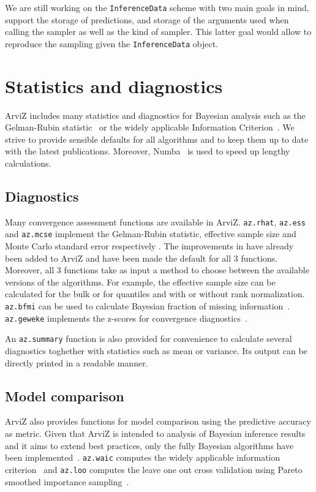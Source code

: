 \documentclass[anonymous=false, %
               format=acmsmall, %
               review=true, %
               screen=true, %
               nonacm=true]{acmart}
\begin{document}
We are still working on the \texttt{InferenceData} scheme with two main goals
in mind, support the storage of predictions, and storage of the arguments used
when calling the sampler as well as the kind of sampler. This latter goal
would allow to reproduce the sampling given the \texttt{InferenceData} object.

\section{Statistics and diagnostics}\label{sec:stats}
ArviZ includes many statistics and diagnostics for Bayesian
analysis such as the Gelman-Rubin statistic~\cite{gelman1992rhat} or the
widely applicable Information Criterion~\cite{watanabe2010waic}.
We strive to provide sensible defaults for all algorithms and to
keep them up to date with the latest publications. Moreover,
Numba~\cite{lam2015numba} is used to
speed up lengthy calculations.

\subsection{Diagnostics}
Many convergence assessment functions are available in ArviZ.
\texttt{az.rhat}, \texttt{az.ess} and \texttt{az.mcse}
implement the Gelman-Rubin statistic, effective sample size and Monte Carlo
standard error respectively \cite{gelman1992rhat, gelman2013bayesian}. %
The improvements in \citet{vehtari2019rank} have already been added to
ArviZ and have been made the default for all 3 functions. Moreover, all 3 functions take
as input a method to choose between the available versions of the algorithms.
For example, the effective sample size can be calculated for the bulk or for
quantiles and with or without rank normalization.
\texttt{az.bfmi} can be used to calculate Bayesian fraction
of missing information~\cite{betancourt2016diagnosing}. \texttt{az.geweke}
implements the z-scores for convergence diagnostics~\cite{geweke1991evaluating}.

An \texttt{az.summary} function is also provided for convenience to calculate
several diagnostics toghether with statistics such as mean or variance.
Its output can be directly printed in a readable manner.

\subsection{Model comparison}
ArviZ also provides functions for model comparison using the predictive
accuracy as metric. Given that ArviZ is intended to analysis of Bayesian
inference results and it aims to extend best practices, only the fully
Bayesian algorithms have been implemented~\cite{gelman2014understanding}.
\texttt{az.waic} computes the
widely applicable information criterion~\cite{watanabe2010waic} and
\texttt{az.loo} computes the leave one out cross validation using Pareto
smoothed importance sampling~\cite{vehtari2015pareto, vehtari2017practical}.
\end{document}
